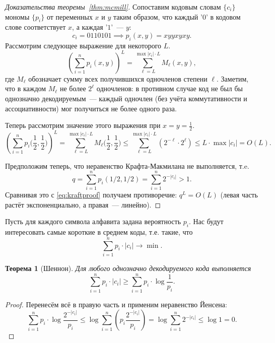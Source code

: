 \documentclass[12pt]{article}
\newcommand{\sshalf}{{\textstyle\frac12}}
\theoremstyle{definition}
\theoremstyle{plain}
\newtheorem{theorem}{Теорема}[section]
\theoremstyle{remark}
\begin{document}
\begin{proof}[Доказательства теоремы~\ref{thm:mcmill}]
    Сопоставим кодовым словам $\{c_i\}$ мономы $\{p_i\}$ от переменных $x$ и $y$ таким 
    образом, что каждый '$0$' в кодовом слове соответствует $x$, а каждая '$1$'~--- $y$:
    \[
        c_i = 0110101 \implies p_i(x,y) = xyyxyxy.
    \]
    Рассмотрим следующее выражение для некоторого $L$.
    \[
        \left( \sum_{i=1}^n p_i(x,y) \right)^L = \sum_{\ell=L}^{\max|c_i| \cdot
        L} M_\ell(x,y),
    \]
    где $M_\ell$ обозначает сумму всех получившихся одночленов степени $\ell$.
    Заметим, что в каждом $M_\ell$ не более $2^\ell$ одночленов: в противном
    случае код не был бы однозначно декодируемым~--- каждый одночлен (без учёта
    коммутативности и ассоциативности) мог получиться не более одного раза.
    
    Теперь рассмотрим значение этого выражения при \(x = y = \frac12\).
    \begin{equation}\label{eq:kraftproof}
        \left( \sum_{i=1}^n p_i\bigl(\sshalf,\sshalf\bigr) \right)^L =
        \sum_{\ell=L}^{\max|c_i| \cdot L} M_\ell\bigl(\sshalf,\sshalf\bigr) \le 
        \sum_{\ell=L}^{\max|c_i| \cdot L} (2^{-\ell} \cdot 2^\ell) \le 
        L\cdot\max|c_i| = O(L).
    \end{equation}

    Предположим теперь, что неравенство Крафта-Макмилана не выполняется, т.e.
    \[
        q = \sum_{i=1}^n p_i(1/2,1/2) = \sum_{i=1}^n 2^{-|c_i|} > 1.
    \]
    Сравнивая это с \eqref{eq:kraftproof} получаем противоречие:
    \(
        q^L = O(L)    
    \) 
    (левая часть растёт экспоненциально, а правая~— линейно).
\end{proof}

Пусть для каждого символа алфавита задана вероятность $p_i$. Нас будут
интересовать самые короткие в среднем коды, т.е. такие, что 
\[
        \sum_{i=1}^n p_i\cdot|c_i| \to \min. 
\]
\begin{theorem}[Шеннон]
    Для любого однозначно декодируемого кода выполняется
    \[
        \sum_{i=1}^n p_i\cdot|c_i|\ge \sum_{i=1}^n p_i\cdot \log\frac1{p_i}. 
    \]
\end{theorem}
\begin{proof}
    Перенесём всё в правую часть и применим неравенство Йенсена:
    \[
    \sum_{i=1}^n p_i\cdot\log\frac{2^{-|c_i|}}{p_i}\le 
    \log\sum_{i=1}^n \left(p_i\frac{2^{-|c_i|}}{p_i}\right) = 
    \log\sum_{i=1}^n 2^{-|c_i|} \le \log 1 = 0. 
    \]
\end{proof}
\end{document}
